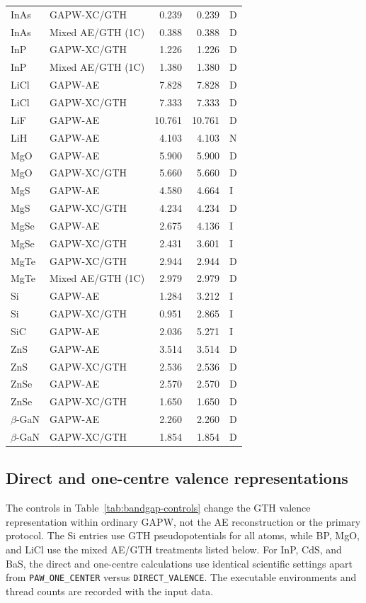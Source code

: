 \documentclass[10pt,a4paper]{article}
\begin{document}
\begin{longtable}{llrrl}
InAs & GAPW-XC/GTH & 0.239 & 0.239 & D \\
InAs & Mixed AE/GTH (1C) & 0.388 & 0.388 & D \\
InP & GAPW-XC/GTH & 1.226 & 1.226 & D \\
InP & Mixed AE/GTH (1C) & 1.380 & 1.380 & D \\
LiCl & GAPW-AE & 7.828 & 7.828 & D \\
LiCl & GAPW-XC/GTH & 7.333 & 7.333 & D \\
LiF & GAPW-AE & 10.761 & 10.761 & D \\
LiH & GAPW-AE & 4.103 & 4.103 & N \\
MgO & GAPW-AE & 5.900 & 5.900 & D \\
MgO & GAPW-XC/GTH & 5.660 & 5.660 & D \\
MgS & GAPW-AE & 4.580 & 4.664 & I \\
MgS & GAPW-XC/GTH & 4.234 & 4.234 & D \\
MgSe & GAPW-AE & 2.675 & 4.136 & I \\
MgSe & GAPW-XC/GTH & 2.431 & 3.601 & I \\
MgTe & GAPW-XC/GTH & 2.944 & 2.944 & D \\
MgTe & Mixed AE/GTH (1C) & 2.979 & 2.979 & D \\
Si & GAPW-AE & 1.284 & 3.212 & I \\
Si & GAPW-XC/GTH & 0.951 & 2.865 & I \\
SiC & GAPW-AE & 2.036 & 5.271 & I \\
ZnS & GAPW-AE & 3.514 & 3.514 & D \\
ZnS & GAPW-XC/GTH & 2.536 & 2.536 & D \\
ZnSe & GAPW-AE & 2.570 & 2.570 & D \\
ZnSe & GAPW-XC/GTH & 1.650 & 1.650 & D \\
$\beta$-GaN & GAPW-AE & 2.260 & 2.260 & D \\
$\beta$-GaN & GAPW-XC/GTH & 1.854 & 1.854 & D \\
\end{longtable}


\subsection{Direct and one-centre valence representations}

The controls in Table~\ref{tab:bandgap-controls} change the GTH valence representation within ordinary GAPW, not the AE reconstruction or the primary protocol. The Si entries use GTH pseudopotentials for all atoms, while BP, MgO, and LiCl use the mixed AE/GTH treatments listed below.  For InP, CdS, and BaS, the direct and one-centre calculations use identical scientific settings apart from \texttt{PAW\_ONE\_CENTER} versus \texttt{DIRECT\_VALENCE}. The executable environments and thread counts are recorded with the input data.
\end{document}

